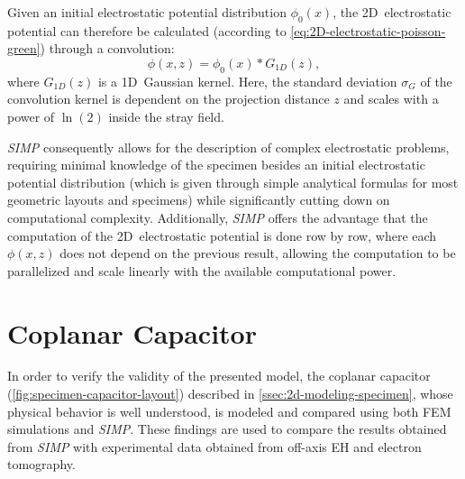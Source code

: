 Given an initial electrostatic potential distribution $\phi_0 \left(x\right)$, the 2D~electrostatic potential can therefore be calculated (according to \cref{eq:2D-electrostatic-poisson-green}) through a convolution:
\begin{equation}
  \label{eq:SIMP-electrostatic-potential-convolution}
  \phi \left(x, z\right) = \phi_0\left(x\right) * G_{\mathit{1D}}\left(z\right),
\end{equation}
where $G_{\mathit{1D}}\left(z\right)$ is a 1D~Gaussian kernel. Here, the standard deviation $\sigma_G$ of the convolution kernel is dependent on the projection distance $z$ and scales with a power of $\ln\left(2\right)$ inside the stray field.

\emph{SIMP} consequently allows for the description of complex electrostatic problems, requiring minimal knowledge of the specimen besides an initial electrostatic potential distribution (which is given through simple analytical formulas for most geometric layouts and specimens) while significantly cutting down on computational complexity. Additionally, \emph{SIMP} offers the advantage that the computation of the 2D~electrostatic potential is done row by row, where each $\phi \left(x, z\right)$ does not depend on the previous result, allowing the computation to be parallelized and scale linearly with the available computational power.
\newpage
\section{Coplanar Capacitor} \label{sec:coplanar-capacitor-SIMP-EH-comparison}
In order to verify the validity of the presented model, the coplanar capacitor (\cref{fig:specimen-capacitor-layout}) described in \cref{ssec:2d-modeling-specimen}, whose physical behavior is well understood, is modeled and compared using both FEM simulations and \emph{SIMP}. These findings are used to compare the results obtained from \emph{SIMP} with experimental data obtained from off-axis EH and electron tomography.

